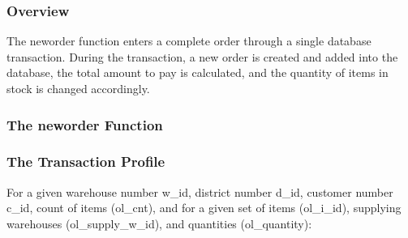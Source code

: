 \subsubsection{Overview}
The neworder function enters a complete order through a single database transaction. During the transaction, a new order is created and added into the database, the total amount to pay is calculated, and the quantity of items in stock is changed accordingly.

\subsubsection{The neworder Function}




\subsubsection{The Transaction Profile}
For a given warehouse number w\_id, district number d\_id, customer number c\_id, count of items (ol\_cnt), and for a given set of items (ol\_i\_id), supplying warehouses (ol\_supply\_w\_id), and quantities (ol\_quantity):

